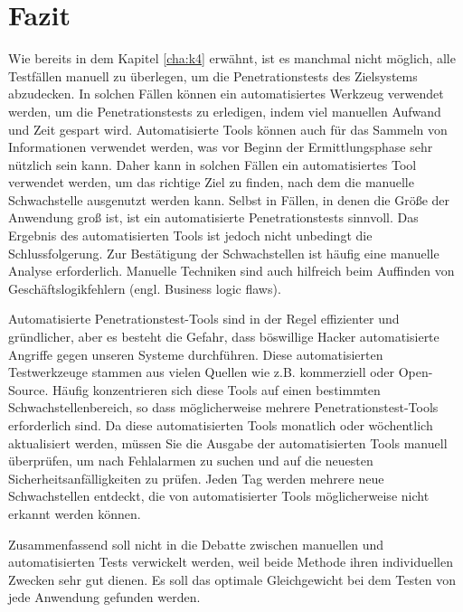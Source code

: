 \chapter{Fazit}
\label{cha:k7}


Wie bereits in dem Kapitel \ref{cha:k4} erwähnt, ist es manchmal nicht möglich, alle Testfällen manuell zu überlegen, um die Penetrationstests des Zielsystems abzudecken. In solchen Fällen können ein automatisiertes Werkzeug verwendet werden, um die Penetrationstests zu erledigen, indem viel manuellen Aufwand und Zeit gespart wird. Automatisierte Tools können auch für das Sammeln von Informationen verwendet werden, was vor Beginn der Ermittlungsphase sehr nützlich sein kann. Daher kann in solchen Fällen ein automatisiertes Tool verwendet werden, um das richtige Ziel zu finden, nach dem die manuelle Schwachstelle ausgenutzt werden kann. Selbst in Fällen, in denen die Größe der Anwendung groß ist, ist ein automatisierte Penetrationstests sinnvoll. Das Ergebnis des automatisierten Tools ist jedoch nicht unbedingt die Schlussfolgerung. Zur Bestätigung der Schwachstellen ist häufig eine manuelle Analyse erforderlich. Manuelle Techniken sind auch hilfreich beim Auffinden von Geschäftslogikfehlern (engl. Business logic flaws).

Automatisierte Penetrationstest-Tools sind in der Regel effizienter und gründlicher, aber es besteht die Gefahr, dass böswillige Hacker automatisierte Angriffe gegen unseren Systeme durchführen. Diese automatisierten Testwerkzeuge stammen aus vielen Quellen wie z.B. kommerziell oder Open-Source. Häufig konzentrieren sich diese Tools auf einen bestimmten Schwachstellenbereich, so dass möglicherweise mehrere Penetrationstest-Tools erforderlich sind. Da diese automatisierten Tools monatlich oder wöchentlich aktualisiert werden, müssen Sie die Ausgabe der automatisierten Tools manuell überprüfen, um nach Fehlalarmen zu suchen und auf die neuesten Sicherheitsanfälligkeiten zu prüfen. Jeden Tag werden mehrere neue Schwachstellen entdeckt, die von automatisierter Tools möglicherweise nicht erkannt werden können.

Zusammenfassend soll nicht in die Debatte zwischen manuellen und automatisierten Tests verwickelt werden, weil beide Methode ihren individuellen Zwecken sehr gut dienen. Es soll das optimale Gleichgewicht bei dem Testen von jede Anwendung gefunden werden.\\

